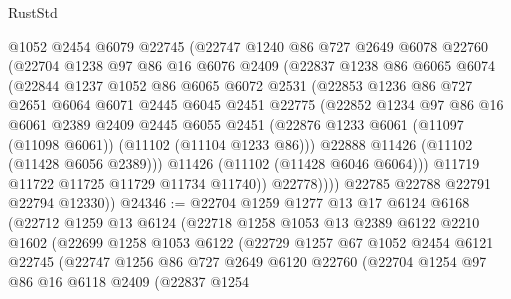 \begin{lexlean}{RustStd}
\begin{coremodule}
            @1052
            @2454
            @6079
            @22745
            (@22747
              @1240
              @86
              @727
              @2649
              @6078
              @22760
              (@22704
                @1238
                @97
                @86
                @16
                @6076
                @2409
                (@22837
                  @1238
                  @86
                  @6065
                  @6074
                  (@22844
                    @1237
                    @1052
                    @86
                    @6065
                    @6072
                    @2531
                    (@22853
                      @1236
                      @86
                      @727
                      @2651
                      @6064
                      @6071
                      @2445
                      @6045
                      @2451
                      @22775
                      (@22852
                        @1234
                        @97
                        @86
                        @16
                        @6061
                        @2389
                        @2409
                        @2445
                        @6055
                        @2451
                        (@22876 @1233 @6061 (@11097 (@11098 @6061)) (@11102 (@11104 @1233 @86)))
                        @22888
                        @11426
                        (@11102 (@11428 @6056 @2389)))
                      @11426
                      (@11102 (@11428 @6046 @6064)))
                    @11719
                    @11722
                    @11725
                    @11729
                    @11734
                    @11740))
                @22778))))
        @22785
        @22788
        @22791
        @22794
        @12330))
@24346 := @22704
    @1259
    @1277
    @13
    @17
    @6124
    @6168
    (@22712
      @1259
      @13
      @6124
      (@22718
        @1258
        @1053
        @13
        @2389
        @6122
        @2210
        @1602
        (@22699
          @1258
          @1053
          @6122
          (@22729
            @1257
            @67
            @1052
            @2454
            @6121
            @22745
            (@22747
              @1256
              @86
              @727
              @2649
              @6120
              @22760
              (@22704
                @1254
                @97
                @86
                @16
                @6118
                @2409
                (@22837
                  @1254

\end{coremodule}
\end{lexlean}
